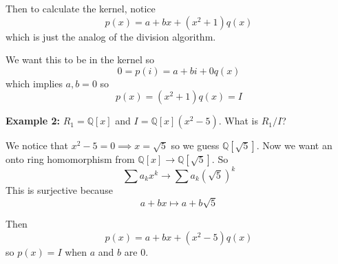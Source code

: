 \documentclass[12pt]{article}
\begin{document}
Then to calculate the kernel, notice 
\[p(x) = a + bx + (x^2 + 1)q(x)\]
which is just the analog of the division algorithm. 

We want this to be in the kernel so 
\[0 = p(i) = a + bi + 0q(x)\]
which implies $a, b = 0$ so 
\[p(x) = (x^2 + 1)q(x) = I\]

\textbf{Example 2:} $R_1 = \mathbb Q[x]$ and $I = \mathbb Q[x](x^2 - 5)$. What is $R_1/I$?

We notice that $x^2 - 5 = 0 \implies x = \sqrt 5$ so we guess $\mathbb{Q}[\sqrt 5]$. Now we want an onto ring homomorphism from $\mathbb Q[x] \to \mathbb{Q}[\sqrt 5]$. So 
\[\sum a_k x^k \to \sum a_k (\sqrt 5)^k\]
This is surjective because 
\[a + bx \mapsto a + b\sqrt 5\]

Then 
\[p(x) = a + bx + (x^2 -5)q(x)\]
so $p(x) = I$ when $a$ and $b$ are $0$. 
\end{document}
